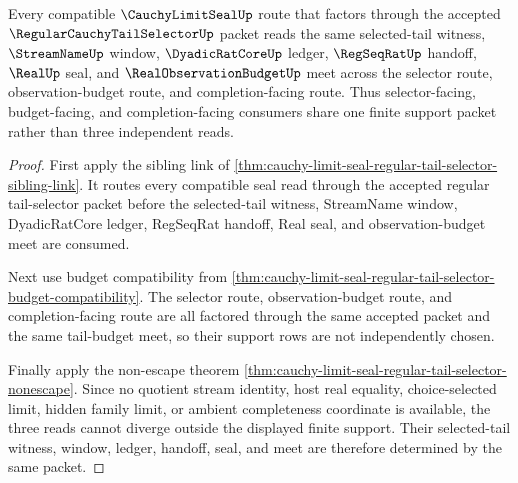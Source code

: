 \begin{theorem}
\label{thm:cauchy-limit-seal-tail-selector-window-support-determinacy}
Every compatible $\CauchyLimitSealUp$ route that factors through the accepted $\RegularCauchyTailSelectorUp$ packet reads the same selected-tail witness, $\StreamNameUp$ window, $\DyadicRatCoreUp$ ledger, $\RegSeqRatUp$ handoff, $\RealUp$ seal, and $\RealObservationBudgetUp$ meet across the selector route, observation-budget route, and completion-facing route. Thus selector-facing, budget-facing, and completion-facing consumers share one finite support packet rather than three independent reads.
\end{theorem}
\begin{proof}
First apply the sibling link of \autoref{thm:cauchy-limit-seal-regular-tail-selector-sibling-link}. It routes every compatible seal read through the accepted regular tail-selector packet before the selected-tail witness, StreamName window, DyadicRatCore ledger, RegSeqRat handoff, Real seal, and observation-budget meet are consumed.

Next use budget compatibility from \autoref{thm:cauchy-limit-seal-regular-tail-selector-budget-compatibility}. The selector route, observation-budget route, and completion-facing route are all factored through the same accepted packet and the same tail-budget meet, so their support rows are not independently chosen.

Finally apply the non-escape theorem \autoref{thm:cauchy-limit-seal-regular-tail-selector-nonescape}. Since no quotient stream identity, host real equality, choice-selected limit, hidden family limit, or ambient completeness coordinate is available, the three reads cannot diverge outside the displayed finite support. Their selected-tail witness, window, ledger, handoff, seal, and meet are therefore determined by the same packet.
\end{proof}

